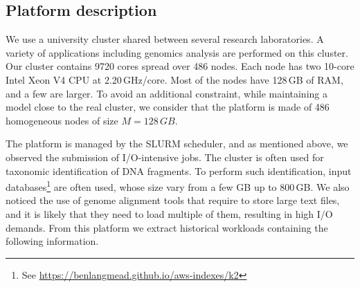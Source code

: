 \documentclass[conference]{IEEEtran}
\newcommand{\memory}{\ensuremath{\mathit{M}}\xspace}
\begin{document}
\subsection{Platform description}
We use a university cluster shared between several research laboratories. A variety of applications including genomics analysis are performed on this cluster.
Our cluster contains 9720 cores spread over 486 nodes. Each node has two
10-core Intel Xeon V4 CPU at 2.20\,GHz/core.
Most of the nodes have 128\,GB of RAM, and a few are larger.
To avoid an additional constraint, while maintaining a model close to the real cluster,
we consider that the platform is made of 486 homogeneous nodes of size
$\memory = 128\,GB$.

The platform is managed by the SLURM scheduler, and as mentioned above, we observed the submission of I/O-intensive jobs.
The cluster is often used for taxonomic identification of DNA fragments. 
To perform such identification, 
input databases\footnote{See \url{https://benlangmead.github.io/aws-indexes/k2}}
are often used,
whose size vary from a few GB up to 800\,GB.
We also noticed the use of genome alignment tools that require to store large text files,
and it is likely that they need to load multiple of them, resulting in high I/O demands.
From this platform we extract historical workloads containing the following information.
\end{document}
